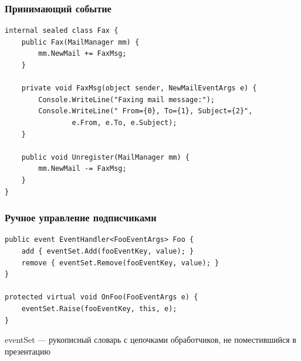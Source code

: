 \documentclass[xetex,mathserif,serif]{beamer}
\begin{document}
	\begin{frame}[fragile]
		\frametitle{Принимающий событие}
		\begin{verbatim}
internal sealed class Fax {
    public Fax(MailManager mm) {
        mm.NewMail += FaxMsg;
    }

    private void FaxMsg(object sender, NewMailEventArgs e) {
        Console.WriteLine("Faxing mail message:");
        Console.WriteLine(" From={0}, To={1}, Subject={2}",
                e.From, e.To, e.Subject);
    }

    public void Unregister(MailManager mm) {
        mm.NewMail -= FaxMsg;
    }
}
		\end{verbatim}
	\end{frame}

	\begin{frame}[fragile]
		\frametitle{Ручное управление подписчиками}
		\begin{verbatim}
public event EventHandler<FooEventArgs> Foo {
    add { eventSet.Add(fooEventKey, value); }
    remove { eventSet.Remove(fooEventKey, value); }
}

protected virtual void OnFoo(FooEventArgs e) {
    eventSet.Raise(fooEventKey, this, e);
}
		\end{verbatim}
		\vspace{7mm}
		eventSet --- рукописный словарь с цепочками обработчиков, не поместившийся в презентацию
	\end{frame}
\end{document}
